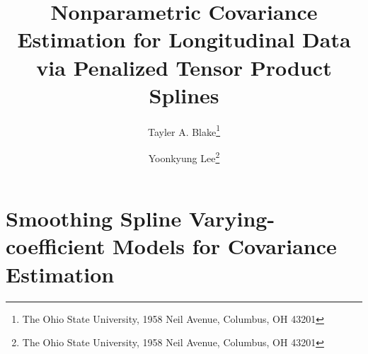\documentclass[12pt]{article}
\theoremstyle{definition}
\def\bL{\mathbf{L}}
\begin{document}
\listoftables
\def\bL{\mathbf{L}}



\title{ Nonparametric Covariance Estimation for Longitudinal Data via Penalized Tensor Product Splines}

\author{Tayler A. Blake\thanks{The Ohio State University, 1958 Neil Avenue, Columbus, OH 43201} \and  Yoonkyung Lee\thanks{The Ohio State University, 1958 Neil Avenue, Columbus, OH 43201}}


\maketitle

\section{Smoothing Spline Varying-coefficient Models for Covariance Estimation}
%
%
%
%
\end{document}
